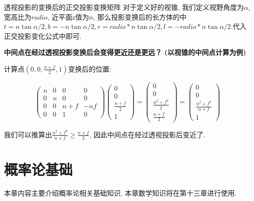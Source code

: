 \documentclass[openany]{progbookcn}
\begin{document}
\begin{titledbox}{透视投影的变换后的正交投影变换矩阵}
	对于定义好的视锥, 我们定义视野角度为$\alpha$, 宽高比为$radio$, 近平面z值为$n$, 那么投影变换后的长方体的中$t=n\tan{\alpha/2}, b=-n\tan{\alpha/2}, r=radio*n\tan{\alpha/2},l=-radio*n\tan{\alpha/2}$.代入正交投影变化公式中即可. 
\end{titledbox}

\begin{question}
	\textbf{中间点在经过透视投影变换后会变得更近还是更远？ (以视锥的中间点计算为例) }
	
	计算点$(0,0,\frac{n+f}{2},1)$变换后的位置: 
	
	\begin{equation}
		\begin{pmatrix}n&0&0&0\\0&n&0&0\\0&0&n+f&-nf\\0&0&1&0\end{pmatrix}\begin{pmatrix}0\\0\\\frac{n+f}{2}\\1\end{pmatrix} = \begin{pmatrix}0\\0\\\frac{n^2+f^2}{2}\\\frac{n+f}{2}\end{pmatrix} =  \begin{pmatrix}0\\0\\\frac{n^2+f^2}{n+f}\\1\end{pmatrix}
	\end{equation}

	我们可以推算出$\frac{n^2+f^2}{n+f}\ge\frac{n+f}{2}$, 因此中间点在经过透视投影后变近了. 
\end{question}

\chapter{概率论基础}

本章内容主要介绍概率论相关基础知识, 本章数学知识将在第十三章进行使用. 
\end{document}
